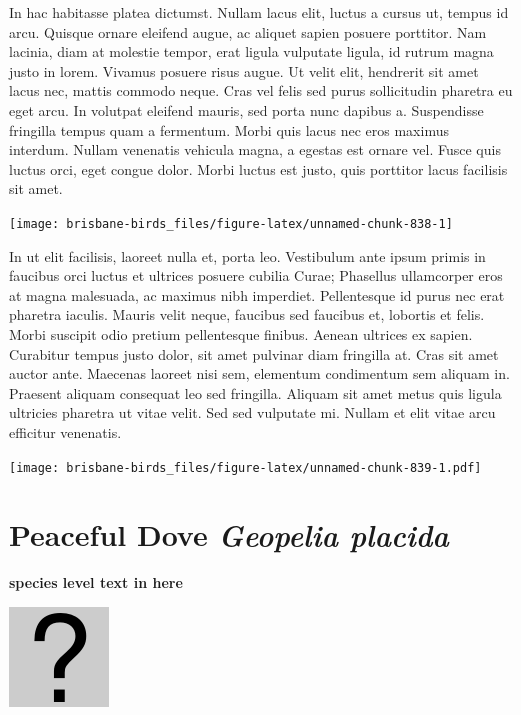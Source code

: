 \documentclass[]{book}
\let\origfigure\figure
\let\endorigfigure\endfigure
\renewenvironment{figure}[1][2] {
  \expandafter\origfigure\expandafter[H]
} {
  \endorigfigure
}
\begin{document}
In hac habitasse platea dictumst. Nullam lacus elit, luctus a cursus ut,
tempus id arcu. Quisque ornare eleifend augue, ac aliquet sapien posuere
porttitor. Nam lacinia, diam at molestie tempor, erat ligula vulputate
ligula, id rutrum magna justo in lorem. Vivamus posuere risus augue. Ut
velit elit, hendrerit sit amet lacus nec, mattis commodo neque. Cras vel
felis sed purus sollicitudin pharetra eu eget arcu. In volutpat eleifend
mauris, sed porta nunc dapibus a. Suspendisse fringilla tempus quam a
fermentum. Morbi quis lacus nec eros maximus interdum. Nullam venenatis
vehicula magna, a egestas est ornare vel. Fusce quis luctus orci, eget
congue dolor. Morbi luctus est justo, quis porttitor lacus facilisis sit
amet.

\begin{figure}
\texttt{[image: brisbane-birds\_files/figure-latex/unnamed-chunk-838-1]} \caption{insert figure caption}\label{fig:unnamed-chunk-838}
\end{figure}

In ut elit facilisis, laoreet nulla et, porta leo. Vestibulum ante ipsum
primis in faucibus orci luctus et ultrices posuere cubilia Curae;
Phasellus ullamcorper eros at magna malesuada, ac maximus nibh
imperdiet. Pellentesque id purus nec erat pharetra iaculis. Mauris velit
neque, faucibus sed faucibus et, lobortis et felis. Morbi suscipit odio
pretium pellentesque finibus. Aenean ultrices ex sapien. Curabitur
tempus justo dolor, sit amet pulvinar diam fringilla at. Cras sit amet
auctor ante. Maecenas laoreet nisi sem, elementum condimentum sem
aliquam in. Praesent aliquam consequat leo sed fringilla. Aliquam sit
amet metus quis ligula ultricies pharetra ut vitae velit. Sed sed
vulputate mi. Nullam et elit vitae arcu efficitur venenatis.

\begin{figure}
\centering
\texttt{[image: brisbane-birds\_files/figure-latex/unnamed-chunk-839-1.pdf]}
\caption{\label{fig:unnamed-chunk-839}insert figure caption}
\end{figure}

\section{\texorpdfstring{Peaceful Dove \emph{Geopelia
placida}}{Peaceful Dove Geopelia placida}}\label{peaceful-dove-geopelia-placida}

\textbf{species level text in here}

\begin{figure}
\centering
\includegraphics{assets/missing.png}
\caption{No image for species}
\end{figure}
\end{document}
